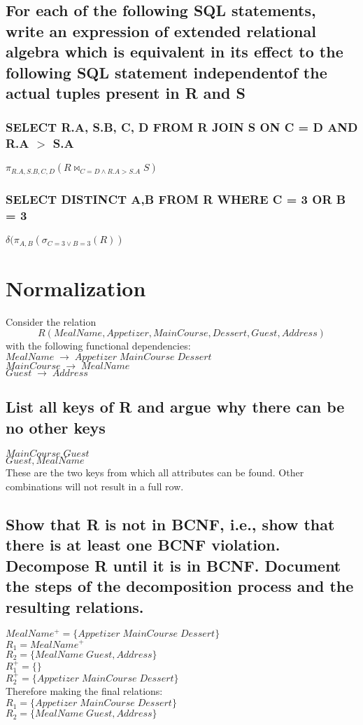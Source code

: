 \documentclass[12pt, a4paper]{article}
\begin{document}
		\subsection{For each of the following SQL statements, write an expression of extended relational algebra which is equivalent in its effect to the following SQL statement independentof the actual tuples present in R and S}
			\subsubsection{SELECT R.A, S.B, C, D FROM R JOIN S ON C = D AND R.A $>$ S.A}
				$\pi_{R.A,S.B,C,D}(R\bowtie_{C=D \land R.A > S.A}S)$
			\subsubsection{SELECT DISTINCT A,B FROM R WHERE C = 3 OR B = 3}
				$\delta(\pi_{A,B}(\sigma_{C=3\lor B=3}(R))$
	\section{Normalization}
		Consider the relation\\
		$$R(MealName,Appetizer,MainCourse,Dessert,Guest,Address)$$
		with the following functional dependencies:\\
		$MealName\;\rightarrow\;Appetizer\;MainCourse\;Dessert$\\
		$MainCourse\;\rightarrow\;MealName$\\
		$Guest\;\rightarrow\;Address$ 
		\subsection{List all keys of R and argue why there can be no other keys}
			$MainCourse\;Guest$\\
			$Guest,MealName$\\
			These are the two keys from which all attributes can be found. Other combinations will not result in a full row.
		\subsection{Show that R is not in BCNF, i.e., show that there is at least one BCNF violation. Decompose R until it is in BCNF. Document the steps of the decomposition process and the resulting relations.}
			$MealName^+=\{Appetizer\;MainCourse\;Dessert\}$\\
			$R_1=MealName^+$\\
			$R_2=\{MealName\;Guest,Address\}$\\
			$R_1^+=\{\}$\\
			$R_2^+=\{Appetizer\;MainCourse\;Dessert\}$\\[4mm]
			Therefore making the final relations:\\
			$R_1=\{Appetizer\;MainCourse\;Dessert\}$\\
			$R_2=\{MealName\;Guest,Address\}$
\end{document}
